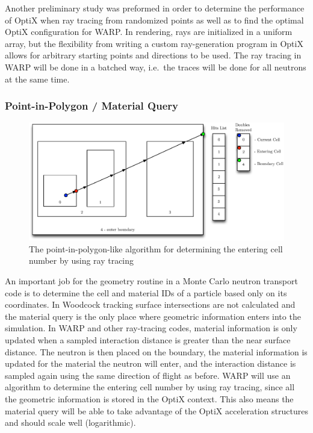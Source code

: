 Another preliminary study was preformed in order to determine the performance of OptiX when ray tracing from randomized points as well as to find the optimal OptiX configuration for WARP.  In rendering, rays are initialized in a uniform array, but the flexibility from writing a custom ray-generation program in OptiX allows for arbitrary starting points and directions to be used.  The ray tracing in WARP will be done in a batched way, i.e.\ the traces will be done for all neutrons at the same time.

\subsubsection{Point-in-Polygon / Material Query}

\begin{figure}[h!] 
  \centering
    \includegraphics[width=1.0\textwidth]{graphics/whereami.eps}
     \caption{The point-in-polygon-like algorithm for determining the entering cell number by using ray tracing \label{whereami} }
\end{figure}

An important job for the geometry routine in a Monte Carlo neutron transport code is to determine the cell and material IDs of a particle based only on its coordinates.  In Woodcock tracking surface intersections are not calculated and the material query is the only place where geometric information enters into the simulation. In WARP and other ray-tracing codes, material information is only updated when a sampled interaction distance is greater than the near surface distance.  The neutron is then placed on the boundary, the material information is updated for the material the neutron will enter, and the interaction distance is sampled again using the same direction of flight as before.  WARP will use an algorithm to determine the entering cell number by using ray tracing, since all the geometric information is stored in the OptiX context.  This also means the material query will be able to take advantage of the OptiX acceleration structures and should scale well (logarithmic).

